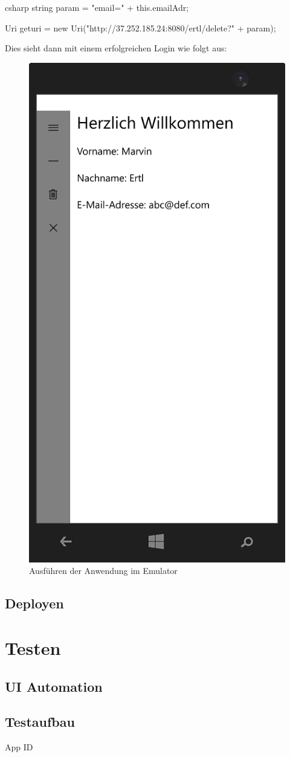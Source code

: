 \begin{code}{csharp}
	string param = "email=" + this.emailAdr;
	
	Uri geturi = new Uri("http://37.252.185.24:8080/ertl/delete?" + param);
\end{code}

Dies sieht dann mit einem erfolgreichen Login wie folgt aus:

\begin{figure}[H]
	\centering
	\includegraphics[width=0.4\linewidth]{images/screenshot006}
	\caption{Ausführen der Anwendung im Emulator}
	\label{fig:screenshot006}
\end{figure}


\subsection{Deployen}

\cite{packaging}

\section{Testen}

\subsection{UI Automation}

\cite{uiautooverview}

\cite{WinAppDriver}

\subsection{Testaufbau}

App ID \cite{appid}
